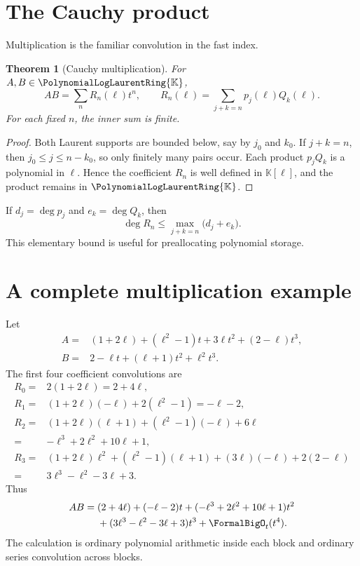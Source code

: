 \documentclass[11pt,oneside,openany]{book}
\newtheorem{theorem}{Theorem}[chapter]
\newcommand{\K}{\mathbb{K}}
\newcommand{\Pring}{\PolynomialLogLaurentRing{\K}}
\begin{document}
\section{The Cauchy product}
Multiplication is the familiar convolution in the fast index.

\begin{theorem}[Cauchy multiplication]\label{thm:cauchymult}
For \(A,B\in\Pring\),
\begin{equation}\label{eq:cauchy}
 AB=\sum_nR_n(\ell)t^n,
 \qquad
 R_n(\ell)=\sum_{j+k=n}p_j(\ell)Q_k(\ell).
\end{equation}
For each fixed \(n\), the inner sum is finite.
\end{theorem}

\begin{proof}
Both Laurent supports are bounded below, say by \(j_0\) and \(k_0\).  If
\(j+k=n\), then \(j_0\leq j\leq n-k_0\), so only finitely many pairs occur.
Each product \(p_jQ_k\) is a polynomial in \(\ell\).  Hence the coefficient
\(R_n\) is well defined in \(\K[\ell]\), and the product remains in \(\Pring\).
\end{proof}

If \(d_j=\deg p_j\) and \(e_k=\deg Q_k\), then
\begin{equation}\label{eq:degreeboundproduct}
 \deg R_n\leq
 \max_{j+k=n}\bigl(d_j+e_k\bigr).
\end{equation}
This elementary bound is useful for preallocating polynomial storage.

\section{A complete multiplication example}
Let
\begin{align*}
 A={}&(1+2\ell)+(\ell^2-1)t+3\ell t^2+(2-\ell)t^3,\\
 B={}&2-\ell t+(\ell+1)t^2+\ell^2t^3.
\end{align*}
The first four coefficient convolutions are
\begin{align*}
 R_0={}&2(1+2\ell)=2+4\ell,\\
 R_1={}&(1+2\ell)(-\ell)+2(\ell^2-1)=-\ell-2,\\
 R_2={}&(1+2\ell)(\ell+1)+(\ell^2-1)(-\ell)+6\ell\\
      ={}&-\ell^3+2\ell^2+10\ell+1,\\
 R_3={}&(1+2\ell)\ell^2+(\ell^2-1)(\ell+1)
          +(3\ell)(-\ell)+2(2-\ell)\\
      ={}&3\ell^3-\ell^2-3\ell+3.
\end{align*}
Thus
\begin{align}\label{eq:multworked}
 AB={}&(2+4\ell)+(-\ell-2)t
 +(-\ell^3+2\ell^2+10\ell+1)t^2\notag\\
 &+(3\ell^3-\ell^2-3\ell+3)t^3+\FormalBigO_t(t^4).
\end{align}
The calculation is ordinary polynomial arithmetic inside each block and
ordinary series convolution across blocks.
\end{document}
